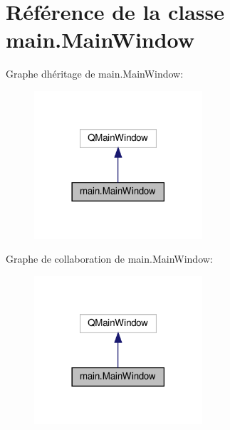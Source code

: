 \hypertarget{classmain_1_1MainWindow}{}\section{Référence de la classe main.\+Main\+Window}
\label{classmain_1_1MainWindow}


Graphe d\textquotesingle{}héritage de main.\+Main\+Window\+:
\nopagebreak
\begin{figure}[H]
\begin{center}
\leavevmode
\includegraphics[width=177pt]{classmain_1_1MainWindow__inherit__graph}
\end{center}
\end{figure}


Graphe de collaboration de main.\+Main\+Window\+:
\nopagebreak
\begin{figure}[H]
\begin{center}
\leavevmode
\includegraphics[width=177pt]{classmain_1_1MainWindow__coll__graph}
\end{center}
\end{figure}
